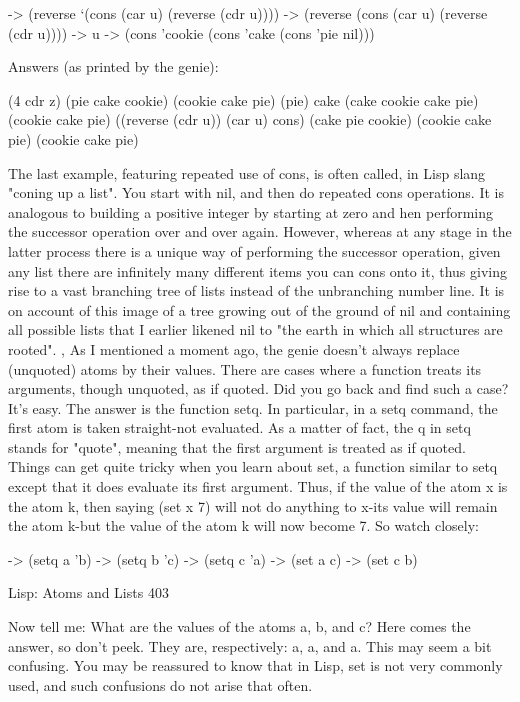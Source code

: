 -> (reverse `(cons (car u) (reverse (cdr u))))
-> (reverse (cons (car u) (reverse (cdr u))))
-> u
-> (cons 'cookie (cons 'cake (cons 'pie nil)))

Answers (as printed by the genie):

(4 cdr z)
(pie cake cookie)
(cookie cake pie)
(pie)
cake
(cake cookie cake pie)
(cookie cake pie)
((reverse (cdr u)) (car u) cons)
(cake pie cookie)
(cookie cake pie)
(cookie cake pie)

         The last example, featuring repeated use of cons, is often called, in Lisp slang
"coning up a list". You start with nil, and then do repeated cons operations. It is
analogous to building a positive integer by starting at zero and hen performing the
successor operation over and over again. However, whereas at any stage in the latter
process there is a unique way of performing the successor operation, given any list
there are infinitely many different items you can cons onto it, thus giving rise to a vast
branching tree of lists instead of the unbranching number line. It is on account of this
image of a tree growing out of the ground of nil and containing all possible lists that I
earlier likened nil to "the earth in which all structures are rooted". ,
         As I mentioned a moment ago, the genie doesn't always replace (unquoted)
atoms by their values. There are cases where a function treats its arguments, though
unquoted, as if quoted. Did you go back and find such a case? It's easy. The answer is
the function setq. In particular, in a setq command, the first atom is taken straight-not
evaluated. As a matter of fact, the q in setq stands for "quote", meaning that the first
argument is treated as if quoted. Things can get quite tricky when you learn about set,
a function similar to setq except that it does evaluate its first argument. Thus, if the
value of the atom x is the atom k, then saying (set x 7) will not do anything to x-its
value will remain the atom k-but the value of the atom k will now become 7. So
watch closely:

-> (setq a 'b)
-> (setq b 'c)
-> (setq c 'a)
-> (set a c)
-> (set c b)




Lisp: Atoms and Lists                                                                 403

Now tell me: What are the values of the atoms a, b, and c? Here comes the answer, so
don't peek. They are, respectively: a, a, and a. This may seem a bit confusing. You
may be reassured to know that in Lisp, set is not very commonly used, and such
confusions do not arise that often.

